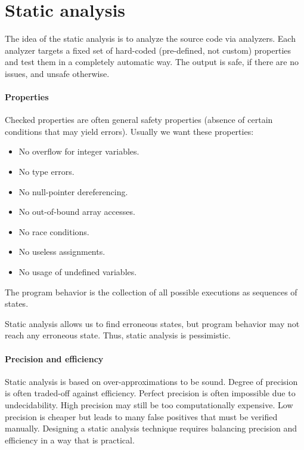 \section{Static analysis}

The idea of the static analysis is to analyze the source code via analyzers. 
Each analyzer targets a fixed set of hard-coded (pre-defined, not custom) properties and test them in a completely automatic way. 
The output is safe, if there are no issues, and unsafe otherwise. 

\paragraph*{Properties}
Checked properties are often general safety properties (absence of certain conditions that may yield errors). 
Usually we want these properties: 
\begin{itemize}
    \item  No overflow for integer variables.
    \item  No type errors.
    \item  No null-pointer dereferencing.
    \item  No out-of-bound array accesses.
    \item  No race conditions.
    \item  No useless assignments.
    \item  No usage of undefined variables.
\end{itemize}

\begin{definition}
    The program behavior is the collection of all possible executions as sequences of states. 
\end{definition}
Static analysis allows us to find erroneous states, but program behavior may not reach any erroneous state. 
Thus, static analysis is pessimistic. 

\paragraph*{Precision and efficiency}
Static analysis is based on over-approximations to be sound.
Degree of precision is often traded-off against efficiency.
Perfect precision is often impossible due to undecidability.
High precision may still be too computationally expensive.
Low precision is cheaper but leads to many false positives that must be verified manually.
Designing a static analysis technique requires balancing precision and efficiency in a way that is practical.


